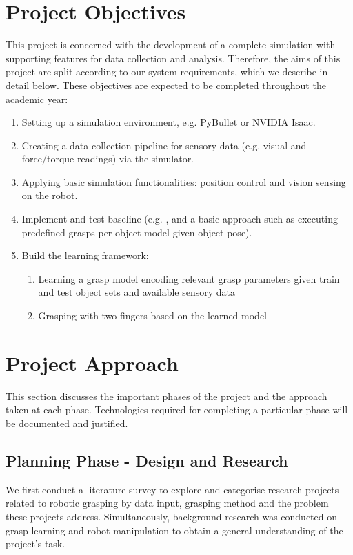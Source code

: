 \documentclass[11pt, a4paper]{report}
\begin{document}
\section{Project Objectives}\label{sec:1.3}
This project is concerned with the development of a complete simulation with supporting features for data collection and analysis. Therefore, the aims of this project are split according to our system requirements, which we describe in detail below. These objectives are expected to be completed throughout the academic year:
\begin{enumerate}
    \item Setting up a simulation environment, e.g. PyBullet \cite{coumans2021} or NVIDIA Isaac. 
    \item Creating a data collection pipeline for sensory data (e.g. visual and force/torque readings) via the simulator.
    \item Applying basic simulation functionalities: position control and vision sensing on the robot.
    \item Implement and test baseline (e.g. \cite{breyer2020volumetric}, and a basic approach such as executing predefined grasps per object model given object pose).
    \item Build the learning framework:
    \begin{enumerate}
        \item Learning a grasp model encoding relevant grasp parameters given train and test object sets and available sensory data
        \item Grasping with two fingers based on the learned model 
    \end{enumerate}
\end{enumerate}


\section{Project Approach}\label{sec:1.4}
This section discusses the important phases of the project and the approach taken at each phase. Technologies required for completing a particular phase will be documented and justified.


\subsection{Planning Phase - Design and Research}\label{sec:1.4.1}
We first conduct a literature survey to explore and categorise research projects related to robotic grasping by data input, grasping method and the problem these projects address. Simultaneously, background research was conducted on grasp learning \cite{platt2022grasp} and robot manipulation to obtain a general understanding of the project's task.
\end{document}
